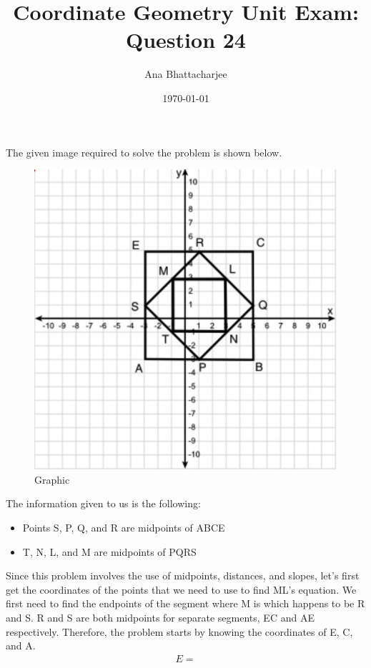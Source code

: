 \documentclass{article}
\begin{document}
\title{Coordinate Geometry Unit Exam: Question 24}
\author{Ana Bhattacharjee}
\date{\today}
\maketitle{}

\begin{center}
The given image required to solve the problem is shown below.
\begin{figure}[!htbp]
  \includegraphics[width=0.9\columnwidth]{q24_figure}
  \caption{Graphic}
\end{figure}
\par
The information given to us is the following:
\begin{itemize}
  \item Points S, P, Q, and R are midpoints of ABCE
  \item T, N, L, and M are midpoints of PQRS
\end{itemize}
\newpage
Since this problem involves the use of midpoints, distances, and slopes, let's first get the coordinates of the points that we need to use to find ML's equation. We first need to find the endpoints of the segment where M is which happens to be R and S. R and S are both midpoints for separate segments, EC and AE respectively. Therefore, the problem starts by knowing the coordinates of E, C, and A.
\begin{align}
  E = 
\end{align}
\end{center}
\end{document}
